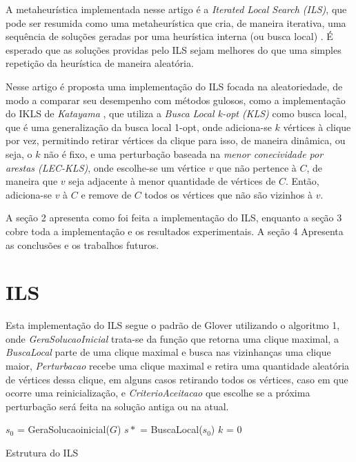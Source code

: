 \documentclass{article}
\begin{document}
A metaheurística implementada nesse artigo é a \textit{Iterated Local Search (ILS)}, que pode ser resumida como uma metaheurística que cria, de maneira iterativa, uma sequência de soluções geradas por uma heurística interna (ou busca local) \cite{handbook}. É esperado que as soluções providas pelo ILS sejam melhores do que uma simples repetição da heurística de maneira aleatória.

Nesse artigo é proposta uma implementação do ILS focada na aleatoriedade, de modo a comparar seu desempenho com métodos gulosos, como a implementação do IKLS de \textit{Katayama} \cite{kopt}, que utiliza a \textit{Busca Local k-opt (KLS)} \cite{KLS} como busca local, que é uma generalização da busca local 1-opt, onde adiciona-se $k$ vértices à clique por vez, permitindo retirar vértices da clique para isso, de maneira dinâmica, ou seja, o $k$ não é fixo,  e uma perturbação baseada na \textit{menor conecividade por arestas (LEC-KLS)}, onde escolhe-se um vértice $v$ que não pertence à $C$, de maneira que $v$ seja adjacente à menor quantidade de vértices de $C$. Então, adiciona-se $v$  à $C$ e remove de $C$ todos os vértices que não são vizinhos à $v$.\par

A seção 2 apresenta como foi feita a implementação do ILS, enquanto a seção 3 cobre toda a implementação e os resultados experimentais. A seção 4 Apresenta as conclusões e os trabalhos futuros.

\section{ILS}


Esta implementação do ILS segue o padrão de Glover \cite{handbook} utilizando o algoritmo 1, onde \textit{GeraSolucaoInicial} trata-se da função que retorna uma clique maximal, a \textit{BuscaLocal} parte de uma clique maximal e busca nas vizinhanças uma clique maior, \textit{Perturbacao} recebe uma clique maximal e retira uma quantidade aleatória de vértices dessa clique, em alguns casos retirando todos os vértices, caso em que ocorre uma reinicialização, e \textit{CriterioAceitacao} que escolhe se a próxima perturbação será feita na solução antiga ou na atual.\par


\begin{algorithm}
 $s_0$ = GeraSolucaoinicial($G$)\;
 $s*$ = BuscaLocal($s_0$)\;
 $k$ = 0\;
 \caption{Estrutura do ILS}
\end{algorithm}
\end{document}
